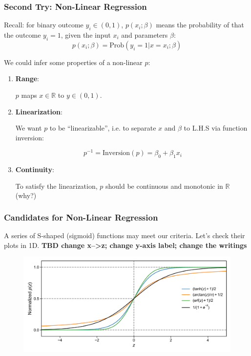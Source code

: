 \documentclass[10pt,aspectratio=169]{beamer}
\begin{document}
\begin{frame}
  \frametitle{Second Try: Non-Linear Regression}

  
  Recall: for binary outcome $y_{i} \in (0, 1)$, $p(x_{i}; \beta)$
  means the probability of that the outcome $y_{i}=1$, given the input
  $x_{i}$ and parameters $\beta$:
  \begin{equation*}
    p(x_{i}; \beta) = \mathrm{Prob}(y_{i}=1 | x=x_{i}; \beta)
  \end{equation*}

  \vspace{1em}

  We could infer some properties of a non-linear $p$:
  \begin{enumerate}
  \item \textbf{Range}:

    $p$ maps $x \in \mathbb{R}$ to $y \in (0, 1)$.
    
  \item \textbf{Linearization}:

    We want $p$ to be ``linearizable'', i.e. to separate $x$ and
    $\beta$ to L.H.S via function inversion:

    \begin{equation*}
      p^{-1} = \mathrm{Inversion}(p) = \beta_{0} + \beta_{1} x_{i}
    \end{equation*}

  \item \textbf{Continuity}:

    To satisfy the linearization, $p$ should be continuous and
    monotonic in $\mathbb{R}$ (why?)
    
  \end{enumerate}
  
\end{frame}

\begin{frame}
  \frametitle{Candidates for Non-Linear Regression}

  A series of S-shaped (sigmoid) functions may meet our
  criteria. Let's check their plots in 1D.  \textbf{TBD change x-->z;
    change y-axis label; change the writings} \vspace{-1em}
  \begin{figure}[t]
    \includegraphics[width=1.\textwidth]{scripts/sigmoid_funs.pdf}
  \end{figure}
\end{frame}
\end{document}
